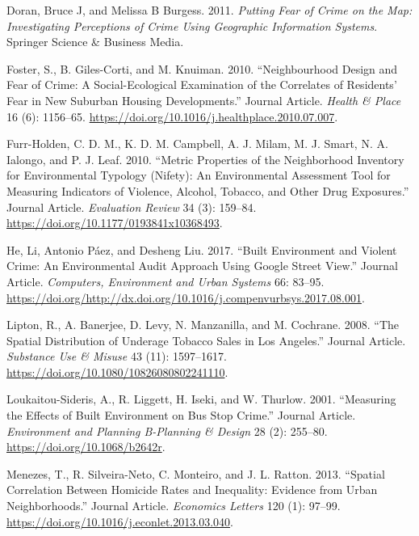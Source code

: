 \documentclass[smallextended]{svjour3}       %
\begin{document}
\leavevmode\hypertarget{ref-Doran2011putting}{}%
Doran, Bruce J, and Melissa B Burgess. 2011. \emph{Putting Fear of Crime
on the Map: Investigating Perceptions of Crime Using Geographic
Information Systems}. Springer Science \& Business Media.

\leavevmode\hypertarget{ref-Foster2010neighbourhood}{}%
Foster, S., B. Giles-Corti, and M. Knuiman. 2010. ``Neighbourhood Design
and Fear of Crime: A Social-Ecological Examination of the Correlates of
Residents' Fear in New Suburban Housing Developments.'' Journal Article.
\emph{Health \& Place} 16 (6): 1156--65.
\url{https://doi.org/10.1016/j.healthplace.2010.07.007}.

\leavevmode\hypertarget{ref-Furr2010metric}{}%
Furr-Holden, C. D. M., K. D. M. Campbell, A. J. Milam, M. J. Smart, N.
A. Ialongo, and P. J. Leaf. 2010. ``Metric Properties of the
Neighborhood Inventory for Environmental Typology (Nifety): An
Environmental Assessment Tool for Measuring Indicators of Violence,
Alcohol, Tobacco, and Other Drug Exposures.'' Journal Article.
\emph{Evaluation Review} 34 (3): 159--84.
\url{https://doi.org/10.1177/0193841x10368493}.

\leavevmode\hypertarget{ref-He2017built}{}%
He, Li, Antonio Páez, and Desheng Liu. 2017. ``Built Environment and
Violent Crime: An Environmental Audit Approach Using Google Street
View.'' Journal Article. \emph{Computers, Environment and Urban Systems}
66: 83--95.
\url{https://doi.org/http://dx.doi.org/10.1016/j.compenvurbsys.2017.08.001}.

\leavevmode\hypertarget{ref-Lipton2008spatial}{}%
Lipton, R., A. Banerjee, D. Levy, N. Manzanilla, and M. Cochrane. 2008.
``The Spatial Distribution of Underage Tobacco Sales in Los Angeles.''
Journal Article. \emph{Substance Use \& Misuse} 43 (11): 1597--1617.
\url{https://doi.org/10.1080/10826080802241110}.

\leavevmode\hypertarget{ref-Loukaitou2001measuring}{}%
Loukaitou-Sideris, A., R. Liggett, H. Iseki, and W. Thurlow. 2001.
``Measuring the Effects of Built Environment on Bus Stop Crime.''
Journal Article. \emph{Environment and Planning B-Planning \& Design} 28
(2): 255--80. \url{https://doi.org/10.1068/b2642r}.

\leavevmode\hypertarget{ref-Menezes2013spatial}{}%
Menezes, T., R. Silveira-Neto, C. Monteiro, and J. L. Ratton. 2013.
``Spatial Correlation Between Homicide Rates and Inequality: Evidence
from Urban Neighborhoods.'' Journal Article. \emph{Economics Letters}
120 (1): 97--99. \url{https://doi.org/10.1016/j.econlet.2013.03.040}.
\end{document}
